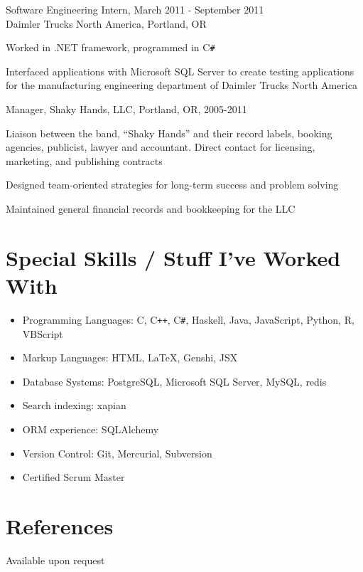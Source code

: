 \documentclass[10pt]{res} %
\newenvironment{packed_item}{
\begin{itemize}
  \setlength{\itemsep}{1pt}
  \setlength{\parskip}{0pt}
  \setlength{\parsep}{0pt}
}{\end{itemize}}
\begin{document}
\begin{resume}
Software Engineering Intern, March 2011 - September 2011 \\ 
Daimler Trucks North America, Portland, OR
\begin{packed_item}
	\item{Worked in .NET framework, programmed in C\verb!#!}
	\item{Interfaced applications with Microsoft SQL Server to create testing 
			applications for the manufacturing engineering department of Daimler 
			Trucks North America}
\end{packed_item}


Manager, Shaky Hands, LLC, Portland, OR, 2005-2011
\begin{packed_item}
\item{Liaison between the band, ``Shaky Hands'' and their record labels, booking
  agencies, publicist, lawyer and accountant. Direct contact for licensing, marketing, and publishing contracts}
\item{Designed team-oriented strategies for long-term success and problem
  solving}
\item{Maintained general financial records and bookkeeping for the LLC}
\end{packed_item}

\section{Special Skills / Stuff I've Worked With} 
\begin{itemize}
\item Programming Languages: C, C\verb!++!, C\verb!#!, Haskell, Java, JavaScript, 
      Python, R, VBScript
\item Markup Languages: HTML, \LaTeX, Genshi, JSX
\item Database Systems: PostgreSQL, Microsoft SQL Server, MySQL, redis
\item Search indexing: xapian
\item ORM experience: SQLAlchemy
\item Version Control: Git, Mercurial, Subversion
\item Certified Scrum Master
\end{itemize}

\section{References} 
Available upon request

\end{resume}
\end{document}
